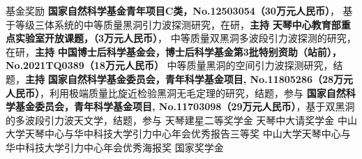 \begin{rubric}{基金奖励}
	\entry*[2026 -- 2028] \textbf{国家自然科学基金青年项目C类，No.12503054（30万元人民币）}，
	基于等级三体系统的中等质量黑洞引力波探测研究，在研，\textbf{主持}
	\entry*[2024 -- 2026] \textbf{天琴中心教育部重点实验室开放课题，（3万元人民币）}，
	中等质量双黑洞多波段引力波探测的研究，在研，\textbf{主持}
	\entry*[2021 -- 2023] \textbf{中国博士后科学基金会，博士后科学基金第3批特别资助（站前），No.2021TQ0389（18万元人民币）}
	中等质量黑洞的空间引力波探测研究，结题，\textbf{主持}
	\entry*[2019 -- 2021] \textbf{国家自然科学基金委员会，青年科学基金项目,
		No.11805286（28万元人民币）}，利用极端质量比旋近检验黑洞无毛定理的研究，结题，参与
	\entry*[2018 -- 2020] \textbf{国家自然科学基金委员会，青年科学基金项目,
		No.11703098（29万元人民币）}，基于双黑洞的多波段引力波天文学，结题，参与
	\entry*[2020] 天琴建星二等奖学金
	\entry*[2019] 天琴中大请奖学金
	\entry*[2019] 中山大学天琴中心与华中科技大学引力中心年会优秀报告三等奖
	\entry*[2018] 中山大学天琴中心与华中科技大学引力中心年会优秀海报奖
	\entry*[2015] 国家奖学金
\end{rubric}
